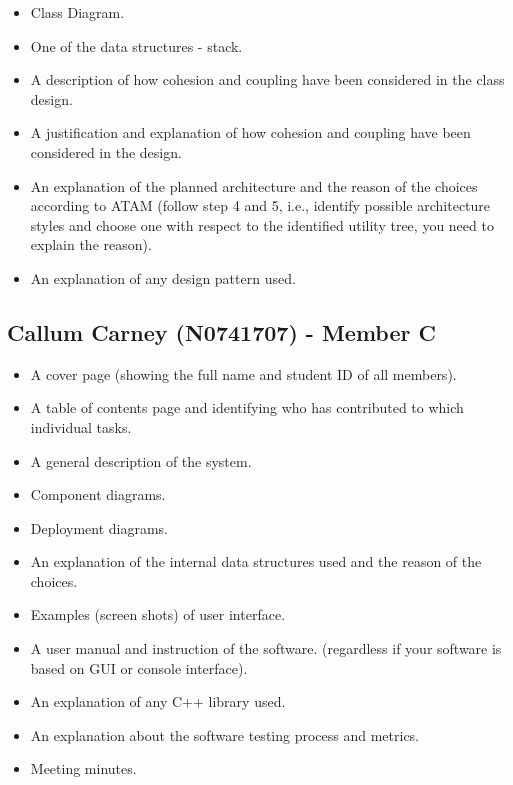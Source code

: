 \documentclass[
  english,
  a4paper,
,tablecaptionabove
]{scrartcl}
\providecommand{\tightlist}{%
  \setlength{\itemsep}{0pt}\setlength{\parskip}{0pt}}
\begin{document}
\begin{itemize}
\tightlist
\item
  Class Diagram.
\item
  One of the data structures - stack.
\item
  A description of how cohesion and coupling have been considered in the
  class design.
\item
  A justification and explanation of how cohesion and coupling have been
  considered in the design.
\item
  An explanation of the planned architecture and the reason of the
  choices according to ATAM (follow step 4 and 5, i.e., identify
  possible architecture styles and choose one with respect to the
  identified utility tree, you need to explain the reason).
\item
  An explanation of any design pattern used.
\end{itemize}

\hypertarget{callum-carney-n0741707---member-c}{%
\subsection{Callum Carney (N0741707) - Member
C}\label{callum-carney-n0741707---member-c}}

\begin{itemize}
\tightlist
\item
  A cover page (showing the full name and student ID of all members).
\item
  A table of contents page and identifying who has contributed to which
  individual tasks.
\item
  A general description of the system.
\item
  Component diagrams.
\item
  Deployment diagrams.
\item
  An explanation of the internal data structures used and the reason of
  the choices.
\item
  Examples (screen shots) of user interface.
\item
  A user manual and instruction of the software. (regardless if your
  software is based on GUI or console interface).
\item
  An explanation of any C++ library used.
\item
  An explanation about the software testing process and metrics.
\item
  Meeting minutes.
\end{itemize}
\end{document}
